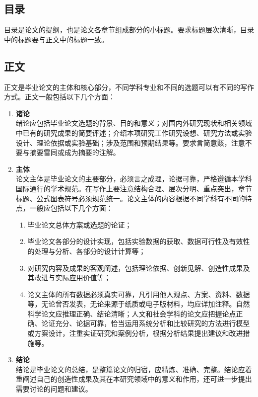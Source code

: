 \subsection{目录}

目录是论文的提纲，也是论文各章节组成部分的小标题。要求标题层次清晰，目录中的标题要与正文中的标题一致。


\subsection{正文}

正文是毕业论文的主体和核心部分，不同学科专业和不同的选题可以有不同的写作方式。正文一般包括以下几个方面：

\begin{enumerate}
    \item \textbf{诸论} \\
          绪论应包括毕业论文选题的背景、目的和意义；对国内外研究现状和相关领域中已有的研究成果的简要评述；介绍本项研究工作研究设想、研究方法或实验设计、理论依据或实验基础；涉及范围和预期结果等。要求言简意赅，注意不要与摘要雷同或成为摘要的注解。
    \item \textbf{主体} \\
          论文主体是毕业论文的主要部分，必须言之成理，论据可靠，严格遵循本学科国际通行的学术规范。在写作上要注意结构合理、层次分明、重点突出，章节标题、公式图表符号必须规范统一。论文主体的内容根据不同学科有不同的特点，一般应包括以下几个方面：
          \begin{enumerate}
              \item 毕业论文总体方案或选题的论证；
              \item 毕业论文各部分的设计实现，包括实验数据的获取、数据可行性及有效性的处理与分析、各部分的设计计算等；
              \item 对研究内容及成果的客观阐述，包括理论依据、创新见解、创造性成果及其改进与实际应用价值等；
              \item 论文主体的所有数据必须真实可靠，凡引用他人观点、方案、资料、数据等，无论曾否发表，无论来源于纸质或电子版材料，均应详加注释。自然科学论文应推理正确、结论清晰；人文和社会学科的论文应把握论点正确、论证充分、论据可靠，恰当运用系统分析和比较研究的方法进行模型或方案设计，注重实证研究和案例分析，根据分析结果提出建议和改进措施等。
          \end{enumerate}
    \item \textbf{结论} \\
          结论是毕业论文的总结，是整篇论文的归宿，应精炼、准确、完整。结论应着重阐述自己的创造性成果及其在本研究领域中的意义和作用，还可进一步提出需要讨论的问题和建议。
\end{enumerate}

